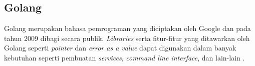 \subsection{Golang}

Golang merupakan bahasa pemrograman yang diciptakan oleh Google dan pada 
tahun 2009 dibagi secara publik. \emph{Libraries}
serta fitur-fitur yang ditawarkan oleh Golang seperti \emph{pointer} dan \emph{error as a value}
dapat digunakan dalam banyak kebutuhan seperti pembuatan \emph{services}, \emph{command line interface},
dan lain-lain \parencite{go-website}.
